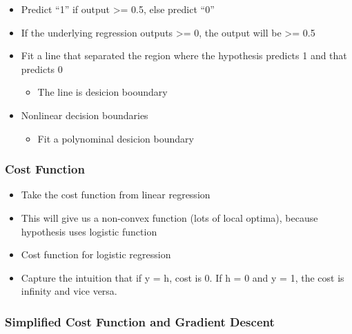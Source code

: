 \documentclass[]{article}
\providecommand{\tightlist}{%
  \setlength{\itemsep}{0pt}\setlength{\parskip}{0pt}}
\begin{document}
\begin{itemize}
\tightlist
\item
  Predict ``1'' if output \textgreater{}= 0.5, else predict ``0''
\item
  If the underlying regression outputs \textgreater{}= 0, the output
  will be \textgreater{}= 0.5
\item
  Fit a line that separated the region where the hypothesis predicts 1
  and that predicts 0

  \begin{itemize}
  \tightlist
  \item
    The line is desicion booundary
  \end{itemize}
\item
  Nonlinear decision boundaries

  \begin{itemize}
  \tightlist
  \item
    Fit a polynominal desicion boundary
  \end{itemize}
\end{itemize}

\hypertarget{cost-function-1}{%
\subsubsection{Cost Function}\label{cost-function-1}}

\begin{itemize}
\tightlist
\item
  Take the cost function from linear regression
\end{itemize}

\begin{itemize}
\tightlist
\item
  This will give us a non-convex function (lots of local optima),
  because hypothesis uses logistic function
\item
  Cost function for logistic regression
\end{itemize}

\begin{itemize}
\tightlist
\item
  Capture the intuition that if y = h, cost is 0. If h = 0 and y = 1,
  the cost is infinity and vice versa.
\end{itemize}

\hypertarget{simplified-cost-function-and-gradient-descent}{%
\subsubsection{Simplified Cost Function and Gradient
Descent}\label{simplified-cost-function-and-gradient-descent}}
\end{document}
